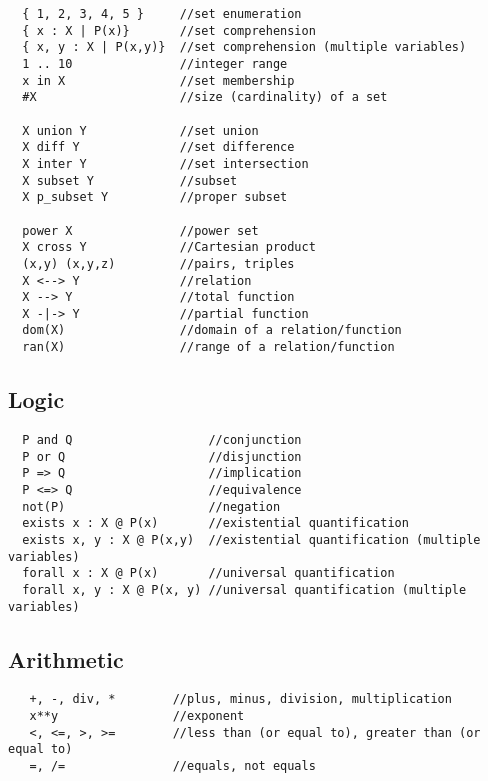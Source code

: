 \documentclass{article}
\begin{document}
\begin{lstlisting}
  { 1, 2, 3, 4, 5 }     //set enumeration
  { x : X | P(x)}       //set comprehension
  { x, y : X | P(x,y)}  //set comprehension (multiple variables)
  1 .. 10               //integer range
  x in X                //set membership
  #X                    //size (cardinality) of a set

  X union Y             //set union
  X diff Y              //set difference
  X inter Y             //set intersection
  X subset Y            //subset
  X p_subset Y          //proper subset

  power X               //power set
  X cross Y             //Cartesian product
  (x,y) (x,y,z)         //pairs, triples
  X <--> Y              //relation
  X --> Y               //total function
  X -|-> Y              //partial function
  dom(X)                //domain of a relation/function
  ran(X)                //range of a relation/function
\end{lstlisting}

\subsection*{Logic}

\begin{lstlisting}
  P and Q                   //conjunction
  P or Q                    //disjunction
  P => Q                    //implication
  P <=> Q                   //equivalence
  not(P)                    //negation
  exists x : X @ P(x)       //existential quantification
  exists x, y : X @ P(x,y)  //existential quantification (multiple variables)
  forall x : X @ P(x)       //universal quantification
  forall x, y : X @ P(x, y) //universal quantification (multiple variables)
\end{lstlisting}

\subsection*{Arithmetic}

\begin{lstlisting}
   +, -, div, *        //plus, minus, division, multiplication
   x**y                //exponent
   <, <=, >, >=        //less than (or equal to), greater than (or equal to)
   =, /=               //equals, not equals
\end{lstlisting}
\end{document}
